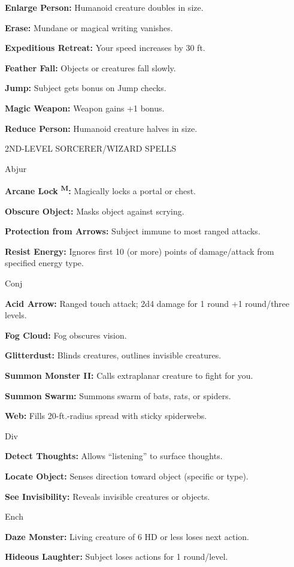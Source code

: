 \documentclass{article}
\begin{document}
\textbf{Enlarge Person:} Humanoid creature doubles in size.

\textbf{Erase: }Mundane or magical writing vanishes.

\textbf{Expeditious Retreat:} Your speed increases by 30 ft.

\textbf{Feather Fall:} Objects or creatures fall slowly.

\textbf{Jump:} Subject gets bonus on Jump checks.

\textbf{Magic Weapon: }Weapon gains +1 bonus.

\textbf{Reduce Person:} Humanoid creature halves in size.

2ND-LEVEL SORCERER/WIZARD SPELLS

Abjur

\textbf{Arcane Lock }\textsuperscript{\textbf{M}}\textbf{:} Magically locks a portal 
or chest.

\textbf{Obscure Object:} Masks object against scrying.

\textbf{Protection from Arrows:} Subject immune to most ranged attacks.

\textbf{Resist Energy:} Ignores first 10 (or more) points of damage/attack from 
specified energy type.

Conj

\textbf{Acid Arrow:} Ranged touch attack; 2d4 damage for 1 round +1 round/three 
levels.

\textbf{Fog Cloud:} Fog obscures vision.

\textbf{Glitterdust:} Blinds creatures, outlines invisible creatures.

\textbf{Summon Monster II:} Calls extraplanar creature to fight for you.

\textbf{Summon Swarm:} Summons swarm of bats, rats, or spiders.

\textbf{Web:} Fills 20-ft.-radius spread with sticky spiderwebs.

Div

\textbf{Detect Thoughts:} Allows ``listening'' to surface thoughts.

\textbf{Locate Object:} Senses direction toward object (specific or type).

\textbf{See Invisibility:} Reveals invisible creatures or objects.

Ench

\textbf{Daze Monster:} Living creature of 6 HD or less loses next action.

\textbf{Hideous Laughter:} Subject loses actions for 1 round/level.
\end{document}
